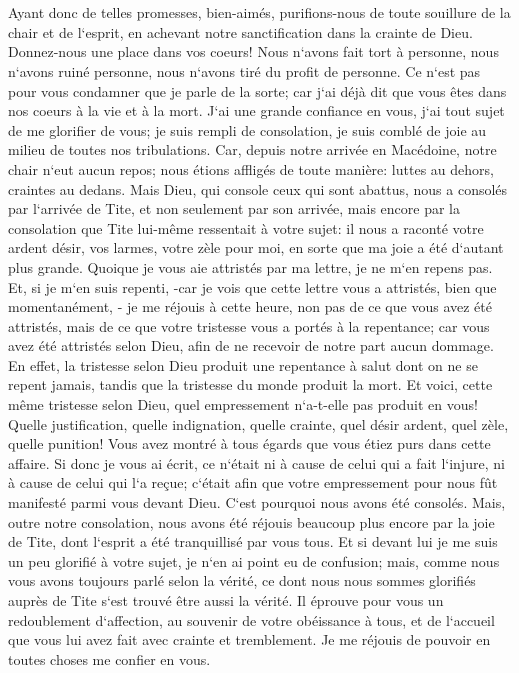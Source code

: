 \chapter{}

\verse Ayant donc de telles promesses, bien-aimés, purifions-nous de toute souillure de la chair et de l`esprit, en achevant notre sanctification dans la crainte de Dieu. 
\verse Donnez-nous une place dans vos coeurs! Nous n`avons fait tort à personne, nous n`avons ruiné personne, nous n`avons tiré du profit de personne. 
\verse Ce n`est pas pour vous condamner que je parle de la sorte; car j`ai déjà dit que vous êtes dans nos coeurs à la vie et à la mort. 
\verse J`ai une grande confiance en vous, j`ai tout sujet de me glorifier de vous; je suis rempli de consolation, je suis comblé de joie au milieu de toutes nos tribulations. 
\verse Car, depuis notre arrivée en Macédoine, notre chair n`eut aucun repos; nous étions affligés de toute manière: luttes au dehors, craintes au dedans. 
\verse Mais Dieu, qui console ceux qui sont abattus, nous a consolés par l`arrivée de Tite, 
\verse et non seulement par son arrivée, mais encore par la consolation que Tite lui-même ressentait à votre sujet: il nous a raconté votre ardent désir, vos larmes, votre zèle pour moi, en sorte que ma joie a été d`autant plus grande. 
\verse Quoique je vous aie attristés par ma lettre, je ne m`en repens pas. Et, si je m`en suis repenti, -car je vois que cette lettre vous a attristés, bien que momentanément, - 
\verse je me réjouis à cette heure, non pas de ce que vous avez été attristés, mais de ce que votre tristesse vous a portés à la repentance; car vous avez été attristés selon Dieu, afin de ne recevoir de notre part aucun dommage. 
\verse En effet, la tristesse selon Dieu produit une repentance à salut dont on ne se repent jamais, tandis que la tristesse du monde produit la mort. 
\verse Et voici, cette même tristesse selon Dieu, quel empressement n`a-t-elle pas produit en vous! Quelle justification, quelle indignation, quelle crainte, quel désir ardent, quel zèle, quelle punition! Vous avez montré à tous égards que vous étiez purs dans cette affaire. 
\verse Si donc je vous ai écrit, ce n`était ni à cause de celui qui a fait l`injure, ni à cause de celui qui l`a reçue; c`était afin que votre empressement pour nous fût manifesté parmi vous devant Dieu. 
\verse C`est pourquoi nous avons été consolés. Mais, outre notre consolation, nous avons été réjouis beaucoup plus encore par la joie de Tite, dont l`esprit a été tranquillisé par vous tous. 
\verse Et si devant lui je me suis un peu glorifié à votre sujet, je n`en ai point eu de confusion; mais, comme nous vous avons toujours parlé selon la vérité, ce dont nous nous sommes glorifiés auprès de Tite s`est trouvé être aussi la vérité. 
\verse Il éprouve pour vous un redoublement d`affection, au souvenir de votre obéissance à tous, et de l`accueil que vous lui avez fait avec crainte et tremblement. 
\verse Je me réjouis de pouvoir en toutes choses me confier en vous. 

